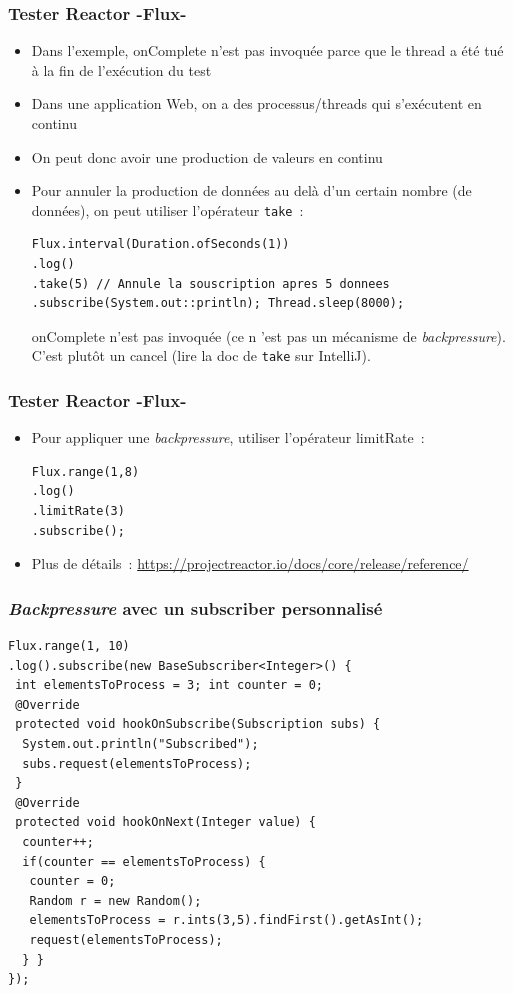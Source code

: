 \documentclass{beamer}
\newcounter{ctr1}
\begin{document}
\begin{frame}[fragile]
	\frametitle{Tester Reactor -Flux-}	
	
	\begin{itemize}
		\item Dans l'exemple, onComplete n'est pas invoquée parce que le thread a été tué à la fin de l'exécution du test
		\item Dans une application Web, on a des processus/threads qui s'exécutent en continu
		\item On peut donc avoir une production de valeurs en continu
		\item Pour annuler la production de données au delà d'un certain nombre (de données), on peut utiliser l'opérateur \texttt{take}~:
\begin{lstlisting}
Flux.interval(Duration.ofSeconds(1))
.log()
.take(5) // Annule la souscription apres 5 donnees
.subscribe(System.out::println); Thread.sleep(8000);
\end{lstlisting}
onComplete n'est pas invoquée (ce n 'est pas un mécanisme de \textit{backpressure}). C'est plutôt un cancel (lire la doc de \texttt{take} sur IntelliJ). 
	\end{itemize}
\end{frame}

\begin{frame}[fragile]
	\frametitle{Tester Reactor -Flux-}	
	
	\begin{itemize}
		\item Pour appliquer une \textit{backpressure}, utiliser l'opérateur limitRate~:
\begin{lstlisting}
Flux.range(1,8)
.log()
.limitRate(3)
.subscribe();
\end{lstlisting}
		\item Plus de détails~:
		{\footnotesize \url{https://projectreactor.io/docs/core/release/reference/}}
	\end{itemize}
\end{frame}

\begin{frame}[fragile]
	\frametitle{\textit{Backpressure} avec un subscriber personnalisé}	

\begin{lstlisting}
Flux.range(1, 10)
.log().subscribe(new BaseSubscriber<Integer>() {
 int elementsToProcess = 3; int counter = 0;
 @Override
 protected void hookOnSubscribe(Subscription subs) {
  System.out.println("Subscribed");
  subs.request(elementsToProcess);
 }
 @Override
 protected void hookOnNext(Integer value) {
  counter++;
  if(counter == elementsToProcess) {
   counter = 0;
   Random r = new Random();
   elementsToProcess = r.ints(3,5).findFirst().getAsInt();
   request(elementsToProcess);
  } }
});
\end{lstlisting}
\end{frame}
\end{document}
